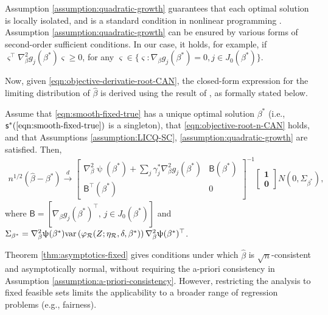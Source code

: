 Assumption \ref{assumption:quadratic-growth} guarantees that each optimal solution is locally isolated, and is a standard condition in nonlinear programming \citep[e.g.,][]{shapiro2014lectures, still2018lectures}. Assumption \ref{assumption:quadratic-growth} can be ensured by various forms of second-order sufficient conditions. In our case,  it holds, for example, if $\varsigma^\top\nabla_\beta^2g_j(\beta^*)\varsigma \geq 0$, for any $\varsigma \in \{\varsigma : \nabla_\beta g_j(\beta^*) = 0, j \in J_0(\beta^*) \}$.
   
Now, given \eqref{eqn:objective-derivatie-root-CAN}, the closed-form expression for the limiting distribution of $\widehat{\beta}$ is derived using the result of \citet[][Lemma B.2]{kim2022counterfactual}, as formally stated below.

\begin{theorem} \label{thm:asymptotics-fixed}
Assume that \ref{eqn:smooth-fixed-true} has a unique optimal solution $\beta^*$ (i.e., $\mathsf{s}^*(\text{\ref{eqn:smooth-fixed-true}})$ is a singleton), that \eqref{eqn:objective-root-n-CAN} holds, and that Assumptions \ref{assumption:LICQ-SC}, \ref{assumption:quadratic-growth} are satisfied. Then,
\begin{align*}
    n^{1/2}\left(\widehat{\beta} - \beta^* \right) \xrightarrow{d}  \begin{bmatrix}
        \nabla_{\beta}^2\uppsi(\beta^*) + \sum_j\gamma_j^*\nabla_{\beta}^2g_j(\beta^*) & \mathsf{B}(\beta^*) \\
        \mathsf{B}^\top(\beta^*) & 0
        \end{bmatrix}^{-1} \begin{bmatrix}
        \bm{1} \\
        \bm{0}
        \end{bmatrix}N\left( 0, \Sigma_{\beta^*} \right),
\end{align*}
where $\mathsf{B} = \left[\nabla_\beta g_j(\beta^*)^\top, \, j \in J_0(\beta^*) \right]$ and $\Sigma_{\beta^*}=\nabla^2_{\beta} \uppsi(\beta^*) \text{var}\left(\varphi_{\mathcal{R}}(Z;\eta_{\mathcal{R}},\delta,\beta^*)\right) \nabla^2_{\beta} \uppsi(\beta^*)^\top$.
\end{theorem}

Theorem \ref{thm:asymptotics-fixed} gives conditions under which $\widehat{\beta}$ is $\sqrt{n}$-consistent and asymptotically normal, without requiring the a-priori consistency in Assumption \ref{assumption:a-priori-consistency}. However, restricting the analysis to fixed feasible sets limits the applicability to a broader range of regression problems (e.g., fairness).


